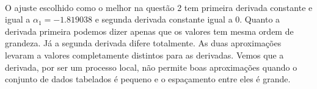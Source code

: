 \FloatBarrier

\paragraph{}O ajuste escolhido como o melhor na questão 2 tem primeira derivada constante e igual a
$\alpha_1 = -1.819038$ e segunda derivada constante igual a 0. Quanto a derivada
primeira podemos dizer apenas que os valores tem mesma ordem de grandeza. Já a segunda
derivada difere totalmente. As duas aproximações levaram a valores completamente distintos
para as derivadas. Vemos que a derivada, por ser um processo local, não permite boas aproximações
quando o conjunto de dados tabelados é pequeno e o espaçamento entre eles é grande.


 
